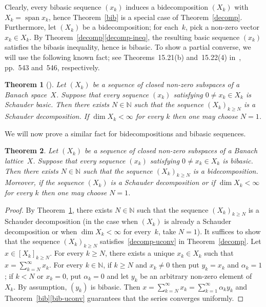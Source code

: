\documentclass[12pt]{amsart}
\theoremstyle{plain}
\newtheorem{theorem}{Theorem}[section]
\theoremstyle{definition}
\DeclareMathOperator{\Span}{span}
\renewcommand{\ge}{\geqslant}
\begin{document}
Clearly, every bibasic sequence $(x_k)$ induces a bidecomposition
$(X_k)$ with $X_k=\Span x_k$, hence Theorem~\ref{bib} is a special
case of Theorem~\ref{decomp}. Furthermore, let $(X_k)$ be a
bidecomposition; for each~$k$, pick a non-zero vector $x_k\in X_k$.
By Theorem~\ref{decomp}\eqref{decomp-ineq}, the resulting basic
sequence $(x_k)$ satisfies the bibasis inequality, hence is
bibasic. To show a partial converse, we will use the following known fact; see
Theorems~15.21(b) and~15.22(4) in~\cite{Singer:81}, pp.~543 and~546,
respectively. 

\begin{theorem}[\cite{Singer:81}]\label{Singer}
  Let $(X_k)$ be a sequence of closed non-zero subspaces of a Banach
  space~$X$. Suppose that every sequence $(x_k)$ satisfying
  $0\ne x_k\in X_k$ is Schauder basic. Then there exists
  $N\in\mathbb N$ such that the sequence $(X_k)_{k\ge N}$ is a
  Schauder decomposition. If $\dim X_k<\infty$ for every $k$ then one
  may choose $N=1$.
\end{theorem}

We will now prove a similar fact for bidecompositions and bibasic
sequences.

\begin{theorem}\label{bib-decomp}
  Let $(X_k)$ be a sequence of closed non-zero subspaces of a Banach
  lattice~$X$. Suppose that every sequence $(x_k)$ satisfying
  $0\ne x_k\in X_k$ is bibasic. Then there exists
  $N\in\mathbb N$ such that the sequence $(X_k)_{k\ge N}$ is a
  bidecomposition. Moreover, if the sequence $(X_k)$ is a Schauder
  decomposition or if $\dim X_k<\infty$ for every $k$ then
  one may choose $N=1$.
\end{theorem}

\begin{proof}
  By Theorem~\ref{Singer}, there exists $N\in\mathbb N$ such that the
  sequence $(X_k)_{k\ge N}$ is a Schauder decomposition (in the case
  when $(X_k)$ is already a Schauder decomposition or when
  $\dim X_k<\infty$ for every~$k$, take $N=1$). It suffices to show
  that the sequence $(X_k)_{k\ge N}$ satisfies~\eqref{decomp-uconv} in
  Theorem~\ref{decomp}. Let $x\in[X_k]_{k\ge N}$. For every $k\ge N$,
  there exists a unique $x_k\in X_k$ such that
  $x=\sum_{k=N}^\infty x_k$. For every $k\in\mathbb N$, if $k\ge N$
  and $x_k\ne 0$ then put $y_k=x_k$ and $\alpha_k=1$; if $k<N$ or
  $x_k=0$, put $\alpha_k=0$ and let $y_k$ be an arbitrary non-zero
  element of~$X_k$. By assumption,
  $(y_k)$ is bibasic. Then
  $x=\sum_{k=N}^\infty x_k=\sum_{k=1}^\infty\alpha_ky_k$ and
  Theorem~\ref{bib}\eqref{bib-uconv} guarantees that the series
  converges uniformly.
\end{proof}
\end{document}
